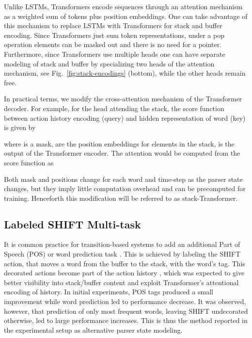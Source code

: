 \documentclass[11pt,a4paper]{article}
\begin{document}
Unlike LSTMs, Transformers \cite{vaswani2017attention} encode sequences through an attention mechanism \cite{bahdanau-etal-2015-neural} as a weighted sum of tokens plus position embeddings. One can take advantage of this mechanism to replace LSTMs with Transformers for stack and buffer encoding. Since Transformers just sum token representations, under a pop operation elements can be masked out and there is no need for a pointer. Furthermore, since Transformers use multiple heads one can have separate modeling of stack and buffer by specializing two heads of the attention mechanism, see Fig.~\ref{fig:stack-encodings} (bottom), while the other heads remain free. 

In practical terms, we modify the cross-attention mechanism of the Transformer decoder. For example, for the head attending the stack, the score function between action history encoding  (query) and hidden representation of word  (key) is given by \vspace{-.2cm}

where  is a  mask,  are the position embeddings for elements in the stack,  is the output of the Transformer encoder. The attention would be computed from the score function as 

Both mask and positions change for each word and time-step as the parser state changes, but they imply little computation overhead and can be precomputed for training. Henceforth this modification will be referred to as stack-Transformer.

\subsection{Labeled SHIFT Multi-task}

It is common practice for transition-based systems to add an additional Part of Speech (POS) or word prediction task \cite{bohnet2012transition}. This is achieved by labeling the \textrm{SHIFT} action, that moves a word from the buffer to the stack, with the word's tag. This decorated actions become part of the action history , which was expected to give better visibility into stack/buffer content and exploit Transformer's attentional encoding of history. In initial experiments, POS tags produced a small improvement while word prediction led to performance decrease. It was observed, however, that prediction of only  most frequent words, leaving \textrm{SHIFT} undecorated otherwise, led to large performance increases. This is thus the method reported in the experimental setup as alternative parser state modeling.
\end{document}
